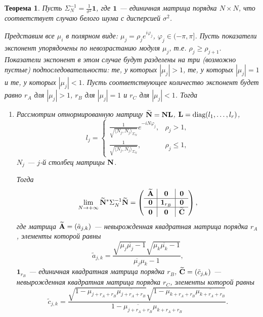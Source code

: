 \documentclass[12pt,a4paper]{article}
\newtheorem{theorem}{Теорема}
\begin{document}
\begin{theorem} \label{th:wninconsistency}
	Пусть $\Sigma_N^{-1} = \frac{1}{\sigma^2}{\mathbf{1}}$, где $\mathbf{1}$ --- единичная матрица порядка $N \times N$, что соответствует случаю белого шума с дисперсией $\sigma^2$.
	
	Представим все $\mu_i$ в полярном виде: $\mu_j = \rho_j e^{i \varphi_j}$, $\varphi_j \in (-\pi, \pi]$. Пусть показатели экспонент упорядочены по невозрастанию модуля $\mu_j$, т.е. $\rho_j \ge \rho_{j+1}$. Показатели экспонент в этом случае будут разделены на три (возможно пустые) подпоследовательности: те, у которых $|\mu_j|>1$, те, у которых $|\mu_j| = 1$ и те, у которых $|\mu_j| < 1$. Пусть соответствующее количество экспонент будет равно $r_A$ для $|\mu_j|>1$, $r_B$ для $|\mu_j|=1$ и $r_C$ для $|\mu_j|<1$. Тогда
	\begin{enumerate}
		\item Рассмотрим отнормированную матрицу $\widetilde {\mathbf{N}} = \mathbf{N} \mathbf{L}$, $\mathbf{L} = \text{diag}(l_1, \ldots, l_r)$, 
		\begin{equation*}
		l_j = \begin{cases}
		\frac{1}{\sqrt{\langle N_j, N_j \rangle_{\Sigma_N}}} e^{-i N \varphi_j}, & \rho_j > 1, \\
		\frac{1}{\sqrt{\langle N_j, N_j \rangle_{\Sigma_N}}}, & \rho_j \le 1,
		\end{cases}
		\end{equation*}
		$N_j$ --- $j$-й столбец матрицы $\mathbf{N}$.
		
		Тогда \begin{equation*}
		\lim_{N \to + \infty} \widetilde {\mathbf{N}}^* \Sigma_N^{-1} \widetilde {\mathbf{N}} = \left( \begin{array}{c|c|c}
		\widetilde {\mathbf{A}} & \mathbf{0} & \mathbf{0} \\ \hline
		\mathbf{0} & \mathbf{1}_{r_B} & \mathbf{0} \\ \hline
		\mathbf{0} & \mathbf{0} & \widetilde {\mathbf{C}}
		\end{array}  \right),
		\end{equation*}
		где матрица $\widetilde {\mathbf{A}} = (\tilde a_{j, k})$ --- невырожденная квадратная матрица порядка $r_A$, элементы которой равны
		\begin{equation*}
		\tilde a_{j, k} = \frac{\sqrt{\mu_j \overline{\mu_j} - 1}\sqrt{\mu_k \overline{\mu_k} - 1}}{\overline{\mu_j} \mu_k - 1},
		\end{equation*}
		$\mathbf{1}_{r_B}$ --- единичная квадратная матрица порядка $r_B$, $\widetilde {\mathbf{C}} = (\tilde c_{j, k})$ --- невырожденная квадратная матрица порядка $r_C$, элементы которой равны
		\begin{equation*}
		\tilde c_{j, k} = \frac{\sqrt{1 - \mu_{j+r_A+r_B} \overline{\mu_{j+r_A+r_B}}}\sqrt{1 - \mu_{k+r_A+r_B} \overline{\mu_{k+r_A+r_B}}}}{1 - \overline{\mu_{j+r_A+r_B}} \mu_{k+r_A+r_B}}.
	    \end{equation*}
	    

\end{enumerate}
\end{theorem}
\end{document}
